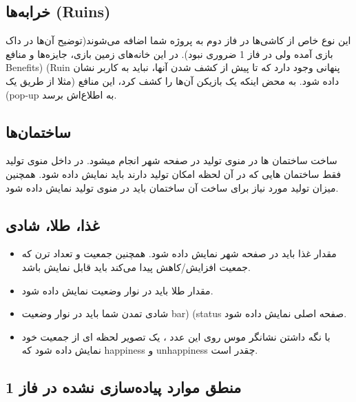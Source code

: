 \documentclass[]{article}
\begin{document}
\subsection*{{\titr خرابه‌ها (Ruins)}}

این نوع خاص از کاشی‌ها در فاز دوم به پروژه شما اضافه می‌شوند(توضیح آن‌ها در داک بازی آمده ولی در فاز 1 ضروری نبود). در این خانه‌های زمین بازی، جایزه‌ها و منافع Benefits) (Ruin پنهانی وجود دارد که تا پیش از کشف شدن آنها، نباید به کاربر نشان داده شود. به محض اینکه یک بازیکن آن‌ها را کشف کرد، این منافع (مثلا از طریق یک (pop-up به اطلاع‌اش برسد. 


\subsection*{{\titr ساختمان‌ها}}

ساخت ساختمان ها در منوی تولید در صفحه شهر انجام میشود. در داخل منوی تولید فقط ساختمان هایی که در آن لحظه امکان تولید دارند باید نمایش داده شود. همچنین میزان تولید مورد نیاز برای ساخت آن ساختمان باید در منوی تولید نمایش داده شود.


\subsection*{{\titr غذا، طلا، شادی}}

\begin{itemize}
\item مقدار غذا باید در صفحه شهر نمایش داده شود. همچنین جمعیت و تعداد ترن که جمعیت افزایش/کاهش پیدا می‌کند باید قابل نمایش باشد.
\item مقدار طلا باید در نوار وضعیت نمایش داده شود.

\item شادی تمدن شما باید در نوار وضعیت bar) (status صفحه اصلی نمایش داده شود.

\item با نگه داشتن نشانگر موس روی این عدد ، یک تصویر لحظه ای از جمعیت خود نمایش داده شود که happiness و unhappiness چقدر است.
\end{itemize}


\subsection*{{\titr منطق موارد پیاده‌سازی نشده در فاز 1}}
\end{document}
